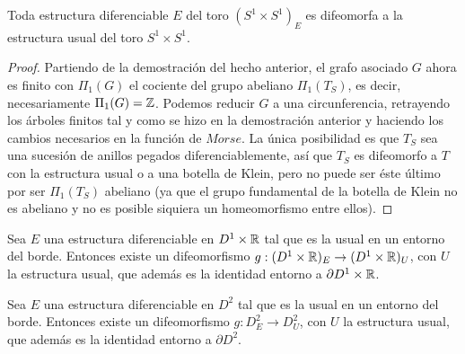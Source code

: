 \begin{hecho}
	Toda estructura diferenciable $E$ del toro $(S^1 \times S^1)_E$ es difeomorfa a la estructura usual del toro $S^1 \times S^1$.
\end{hecho}

\begin{proof}
	Partiendo de la demostración del hecho anterior, el grafo asociado $G$ ahora es finito con $\Pi_1(G)$ el cociente del grupo abeliano $\Pi_1(T_S)$, es decir, necesariamente $\Pi_1(G) = \mathbb{Z}$. Podemos reducir $G$ a una circunferencia, retrayendo los árboles finitos tal y como se hizo en la demostración anterior y haciendo los cambios necesarios en la función de $Morse$. La única posibilidad es que $T_S$ sea una sucesión de anillos pegados diferenciablemente, así que $T_S$ es difeomorfo a $T$ con la estructura usual o a una botella de Klein, pero no puede ser éste último por ser $\Pi_1(T_S)$ abeliano (ya que el grupo fundamental de la botella de Klein no es abeliano y no es posible siquiera un homeomorfismo entre ellos).
\end{proof}

\begin{hecho}
	Sea $E$ una estructura diferenciable en $D^1 \times \mathbb{R}$ tal que es la usual en un entorno del borde. Entonces existe un difeomorfismo $g:(D^1 \times \mathbb{R})_E \rightarrow (D^1 \times \mathbb{R})_U$, con $U$ la estructura usual, que además es la identidad entorno a $\partial D^1 \times \mathbb{R}$.
\end{hecho}

\begin{hecho}
	Sea $E$ una estructura diferenciable en $D^2$ tal que es la usual en un entorno del borde. Entonces existe un difeomorfismo $g:D^2_E \rightarrow D^2_U$, con $U$ la estructura usual, que además es la identidad entorno a $\partial D^2$.
\end{hecho}



\endinput
